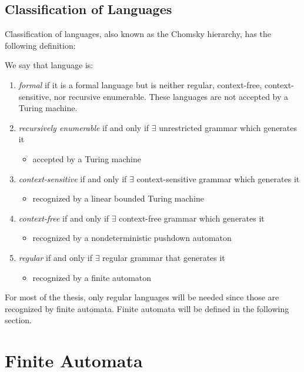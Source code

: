 \subsection{Classification of Languages}
Classification of languages, also known as the Chomsky hierarchy, has the following definition:
\begin{definition}
    We say that language is:
\end{definition}
\begin{enumerate}
    \item \textit{formal} if it is a formal language but is neither regular, context-free, context-sensitive, nor recursive enumerable. These languages are not accepted by a Turing machine.
    \item \textit{recursively enumerable} if and only if $\exists$ unrestricted grammar which generates it
    \begin{itemize}
        \item accepted by a Turing machine
    \end{itemize}
    \item \textit{context-sensitive} if and only if $\exists$ context-sensitive grammar which generates it
    \begin{itemize}
        \item recognized by a linear bounded Turing machine
    \end{itemize}
    \item \textit{context-free} if and only if $\exists$ context-free grammar which generates it
    \begin{itemize}
        \item recognized by a nondeterministic pushdown automaton
    \end{itemize}
    \item \textit{regular} if and only if $\exists$ regular grammar that generates it
    \begin{itemize}
        \item recognized by a finite automaton
    \end{itemize}
\end{enumerate}

For most of the thesis, only regular languages will be needed since those are recognized by finite automata. Finite automata will be defined in the following section.

\section{Finite Automata}

